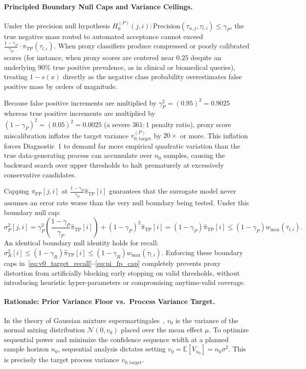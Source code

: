 \documentclass[11pt,a4paper]{article}
\begin{document}
\paragraph{Principled Boundary Null Caps and Variance Ceilings.}
Under the precision null hypothesis $H_0^{(P)}(j, i): \text{Precision}(\tau_{u, j}, \tau_{l, i}) \le \gamma_P$, the true negative mass routed to automated acceptance cannot exceed $\frac{1 - \gamma_P}{\gamma_P} \cdot \pi_{\text{TP}}(\tau_{l, i})$. When proxy classifiers produce compressed or poorly calibrated scores (for instance, when proxy scores are centered near $0.25$ despite an underlying $90\%$ true positive prevalence, as in clinical or biomedical queries), treating $1 - s(x)$ directly as the negative class probability overestimates false positive mass by orders of magnitude. 

Because false positive increments are multiplied by $\gamma_P^2 = (0.95)^2 = 0.9025$ whereas true positive increments are multiplied by $(1 - \gamma_P)^2 = (0.05)^2 = 0.0025$ (a severe $361:1$ penalty ratio), proxy score miscalibration inflates the target variance $v_{0, \text{target}}^{(P)}$ by $20\times$ or more. This inflation forces Diagnostic~1 to demand far more empirical quadratic variation than the true data-generating process can accumulate over $n_0$ samples, causing the backward search over upper thresholds to halt prematurely at excessively conservative candidates.

Capping $\hat{\pi}_{\text{FP}}[j, i]$ at $\frac{1 - \gamma_P}{\gamma_P} \hat{\pi}_{\text{TP}}[i]$ guarantees that the surrogate model never assumes an error rate worse than the very null boundary being tested. Under this boundary null cap:
\begin{equation}
\sigma_P^2[j, i] = \gamma_P^2 \left(\frac{1 - \gamma_P}{\gamma_P} \hat{\pi}_{\text{TP}}[i]\right) + (1 - \gamma_P)^2 \hat{\pi}_{\text{TP}}[i] = (1 - \gamma_P) \hat{\pi}_{\text{TP}}[i] \le (1 - \gamma_P) w_{\max}(\tau_{l, i}).
\end{equation}
An identical boundary null identity holds for recall: $\sigma_R^2[i] \le (1 - \gamma_R) \hat{\pi}_{\text{TP}}[i] \le (1 - \gamma_R) w_{\max}(\tau_{l, i})$. Enforcing these boundary caps in~\eqref{eq:v0_target_recall}--\eqref{eq:pi_fp_cap} completely prevents proxy distortion from artificially blocking early stopping on valid thresholds, without introducing heuristic hyper-parameters or compromising anytime-valid coverage.

\paragraph{Rationale: Prior Variance Floor vs.\ Process Variance Target.}
In the theory of Gaussian mixture supermartingales~\cite{robbins1970,howard2021}, $v_0$ is the variance of the normal mixing distribution $\mathcal{N}(0, v_0)$ placed over the mean effect $\mu$. To optimize sequential power and minimize the confidence sequence width at a planned sample horizon $n_0$, sequential analysis dictates setting $v_0 = \mathbb{E}[V_{n_0}] = n_0 \sigma^2$. This is precisely the target process variance $v_{0, \text{target}}$.
\end{document}
